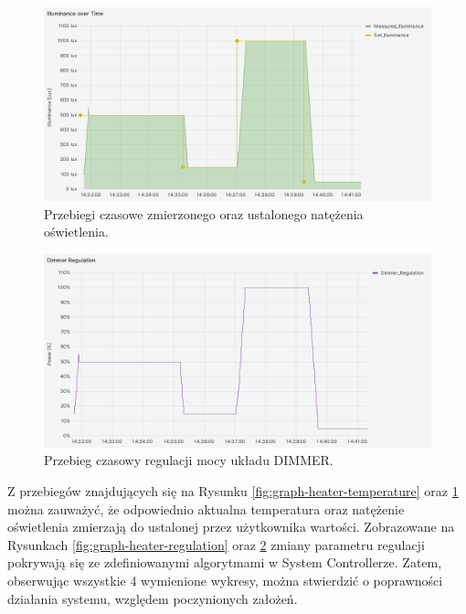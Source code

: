 \begin{figure}[H]
    \centering
    \includegraphics[width=0.8\linewidth]{graphics/grafana/illuminance-lm.png}
    \caption{Przebiegi czasowe zmierzonego oraz ustalonego natężenia oświetlenia.}
    \label{fig:graph-dimmer-illuminance}
\end{figure}

\begin{figure}[H]
    \centering
    \includegraphics[width=0.8\linewidth]{graphics/grafana/dimmer_regulation-lm.png}
    \caption{Przebieg czasowy regulacji mocy układu DIMMER.}
    \label{fig:graph-dimmer-regulation}
\end{figure}
    
    Z przebiegów znajdujących się na Rysunku \ref{fig:graph-heater-temperature} oraz \ref{fig:graph-dimmer-illuminance} można zauważyć, że odpowiednio aktualna temperatura oraz natężenie oświetlenia zmierzają do ustalonej przez użytkownika wartości. Zobrazowane na Rysunkach \ref{fig:graph-heater-regulation} oraz \ref{fig:graph-dimmer-regulation} zmiany parametru regulacji pokrywają się ze zdefiniowanymi algorytmami w System Controllerze. Zatem, obserwując wszystkie 4 wymienione wykresy, można stwierdzić o poprawności działania systemu, względem poczynionych założeń.